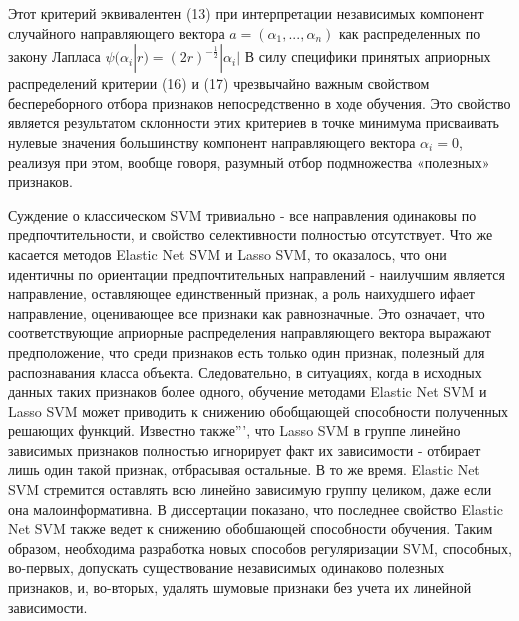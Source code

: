 \documentclass[../body.tex]{subfiles}
\begin{document}
Этот критерий эквивалентен (13) при интерпретации независимых компонент случайного
направляющего вектора $a=(\alpha_1, ..., \alpha_n)$ как распределенных по закону Лапласа $\psi(\alpha_i|r) = (2r)^{-\frac{1}{2}}|\alpha_i|$
В силу специфики принятых априорных распределений критерии (16) и (17) чрезвычайно важным свойством беспереборного отбора признаков непосредственно в ходе обучения. Это свойство является результатом
склонности этих критериев в точке минимума присваивать нулевые значения большинству
компонент направляющего вектора $\alpha_i = 0$, реализуя при этом, вообще говоря, разумный
отбор подмножества «полезных» признаков. 

Суждение о классическом SVM тривиально - все направления одинаковы по предпочтительности, и свойство селективности полностью отсутствует. Что же касается методов
Elastic Net SVM и Lasso SVM, то оказалось, что они идентичны по ориентации предпочтительных направлений - наилучшим является направление, оставляющее единственный
признак, а роль наихудшего ифает направление, оценивающее все признаки как равнозначные. Это означает, что соответствующие априорные распределения направляющего
вектора выражают предположение, что среди признаков есть только один признак, полезный для распознавания класса объекта. Следовательно, в ситуациях, когда в исходных
данных таких признаков более одного, обучение методами Elastic Net SVM и Lasso SVM
может приводить к снижению обобщающей способности полученных решающих функций.
Известно также''', что Lasso SVM в группе линейно зависимых признаков полностью
игнорирует факт их зависимости - отбирает лишь один такой признак, отбрасывая остальные. В то же время. Elastic Net SVM стремится оставлять всю линейно зависимую группу
целиком, даже если она малоинформативна. В диссертации показано, что последнее свойство Elastic Net SVM также ведет к снижению обобшающей способности обучения.
Таким образом, необходима разработка новых способов регуляризации SVM, способных, во-первых, допускать существование независимых одинаково полезных признаков, и,
во-вторых, удалять шумовые признаки без учета их линейной зависимости. 
\\
\end{document}
